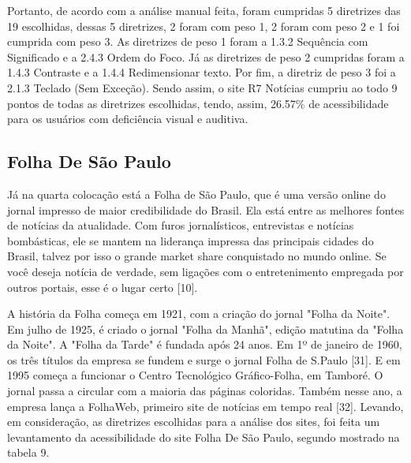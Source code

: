 \documentclass[a4paper]{article}
\begin{document}
\begin{titlepage}
Portanto, de acordo com a análise manual feita, foram cumpridas 5 diretrizes das 19 escolhidas, dessas 5 diretrizes, 2 foram com peso 1, 2 foram com peso 2 e 1 foi cumprida com peso 3. As diretrizes de peso 1 foram a 1.3.2 Sequência com Significado e a 2.4.3 Ordem do Foco. Já as diretrizes de peso 2 cumpridas foram a 1.4.3 Contraste e a 1.4.4 Redimensionar texto. Por fim, a diretriz de peso 3 foi a 2.1.3 Teclado (Sem Exceção). Sendo assim, o site R7 Notícias cumpriu ao todo 9 pontos de todas as diretrizes escolhidas, tendo, assim, 26.57\% de acessibilidade para os usuários com deficiência visual e auditiva.

\subsection{Folha De São Paulo}

Já na quarta colocação está a Folha de São Paulo, que é uma versão online do jornal impresso de maior credibilidade do Brasil. Ela está entre as melhores fontes de notícias da atualidade. Com furos jornalísticos, entrevistas e notícias bombásticas, ele se mantem na liderança impressa das principais cidades do Brasil, talvez por isso o grande market share conquistado no mundo online. Se você deseja notícia de verdade, sem ligações com o entretenimento empregada por outros portais, esse é o lugar certo [10].

A história da Folha começa em 1921, com a criação do jornal "Folha da Noite". Em julho de 1925, é criado o jornal "Folha da Manhã", edição matutina da "Folha da Noite". A "Folha da Tarde" é fundada após 24 anos. Em 1º de janeiro de 1960, os três títulos da empresa se fundem e surge o jornal Folha de S.Paulo [31]. E em 1995 começa a funcionar o Centro Tecnológico Gráfico-Folha, em Tamboré. O jornal passa a circular com a maioria das páginas coloridas. Também nesse ano, a empresa lança a FolhaWeb, primeiro site de notícias em tempo real [32]. Levando, em consideração, as diretrizes escolhidas para a análise dos sites, foi feita um levantamento da acessibilidade do site Folha De São Paulo, segundo mostrado na tabela 9.\\


\end{titlepage}
\end{document}
